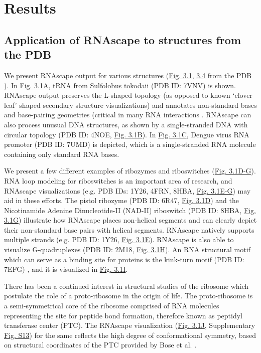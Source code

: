 \section{Results}
\subsection{Application of RNAscape to structures from the PDB}

We present RNAscape output for various structures (\hyperref[fig:rnascape4]{Fig. 3.1}, \hyperref[fig:rnascape4]{3.4} from the PDB \citep{berman2000protein}). In \hyperref[fig:rnascape1]{Fig. 3.1A}, tRNA from Sulfolobus tokodaii (PDB ID: 7VNV) is shown. RNAscape output preserves the L-shaped topology (as opposed to known ‘clover leaf’ shaped secondary structure \citep{Krahn2020} visualizations) and annotates non-standard bases and base-pairing geometries (critical in many RNA interactions \citep{Hermann1999}. RNAscape can also process unusual DNA structures, as shown by a single-stranded DNA with circular topology (PDB ID: 4NOE, \hyperref[fig:rnascape1]{Fig. 3.1B}). In \hyperref[fig:rnascape1]{Fig. 3.1C}, Dengue virus RNA promoter (PDB ID: 7UMD) is depicted, which is a single-stranded RNA molecule containing only standard RNA bases.

We present a few different examples of ribozymes and riboswitches (\hyperref[fig:rnascape1]{Fig. 3.1D-G}). RNA loop modeling \citep{Sripakdeevong2011} for riboswitches is an important area of research, and RNAscape visualizations (e.g. PDB IDs: 1Y26, 4FRN, 8HBA, \hyperref[fig:rnascape1]{Fig. 3.1E-G}) may aid in these efforts. The pistol ribozyme (PDB ID: 6R47, \hyperref[fig:rnascape1]{Fig. 3.1D}) and the Nicotinamide Adenine Dinucleotide-II (NAD-II) riboswitch (PDB ID: 8HBA, \hyperref[fig:rnascape1]{Fig. 3.1G}) illustrate how RNAscape places non-helical segments and can clearly depict their non-standard base pairs with helical segments. RNAscape natively supports multiple strands (e.g. PDB ID: 1Y26, \hyperref[fig:rnascape1]{Fig. 3.1E}). RNAscape is also able to visualize G-quadruplexes (PDB ID: 2M18, \hyperref[fig:rnascape1]{Fig. 3.1H}). An RNA structural motif which can serve as a binding site for proteins is the kink-turn motif (PDB ID: 7EFG) \citep{Schroeder2010}, and it is visualized in \hyperref[fig:rnascape1]{Fig. 3.1I}.

There has been a continued interest in structural studies of the ribosome which postulate the role of a proto-ribosome \citep{Bose2022} in the origin of life. The proto-ribosome is a semi-symmetrical core of the ribosome comprised of RNA molecules representing the site for peptide bond formation, therefore known as peptidyl transferase center (PTC). The RNAscape visualization (\hyperref[fig:rnascape1]{Fig. 3.1J}, Supplementary \hyperref[fig:rnascapeS1]{Fig. S13}) for the same reflects the high degree of conformational symmetry, based on structural coordinates of the PTC provided by Bose et al. \citep{Bose2022,}.

